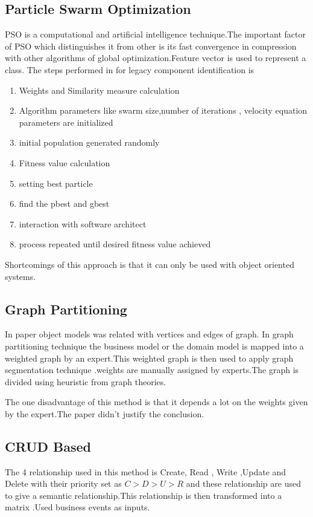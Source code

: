 \documentclass[12pt]{article}
\begin{document}
\subsection{Particle Swarm Optimization}
PSO is a computational and artificial intelligence technique\cite{pso1}.The important factor of PSO which distinguishes it from other is its fast convergence in compression with other algorithms of global optimization.Feature vector is used to represent a class.
The steps performed in \cite{pso} for legacy component identification is
\begin{enumerate}
	\item Weights and Similarity measure calculation
	\item Algorithm parameters like swarm size,number of iterations , velocity equation parameters are initialized
	\item initial population generated randomly
	\item Fitness value calculation
	\item setting best particle 
	\item find the pbest and gbest
	\item interaction with software architect
	\item process repeated until desired fitness value achieved
\end{enumerate}
Shortcomings of this approach is that it can only be used with object oriented systems.
\subsection{Graph Partitioning}
In paper \cite{graphPartion} object models was related with vertices and edges of graph.
In graph partitioning technique the business model or the domain model is mapped into a weighted graph by an expert.This weighted graph is then used to apply graph segmentation technique .weights are manually assigned by experts.The graph is divided using heuristic from graph theories.

The one disadvantage of this method is that it depends a lot on the weights given by the expert.The paper didn't justify the conclusion.


\subsection{CRUD Based}

The 4 relationship used in this method is Create, Read , Write ,Update and Delete with their priority set as $C > D > U > R$ and these relationship are used to give a semantic relationship.This relationship is then transformed into a matrix .\cite{CRUD}Used business events as inputs.
\end{document}
